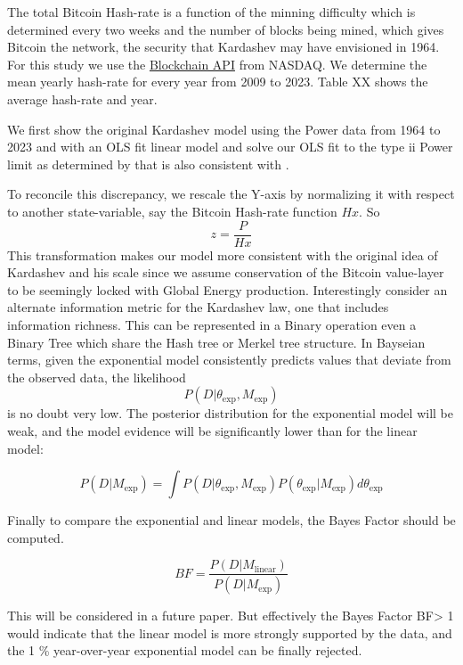 \documentclass[final,5p,times,twocolumn,authoryear]{elsarticle}
\begin{document}
The total Bitcoin Hash-rate is a function of the minning difficulty which is determined every two weeks and the number of blocks being mined, which gives Bitcoin the network, the security that Kardashev may have envisioned in 1964. For this study we use the \href{https://data.nasdaq.com/data/BCHAIN/HRATE-bitcoin-hash-rate}{Blockchain API} from NASDAQ. We determine the mean yearly hash-rate for every year from 2009 to 2023. Table XX shows the average hash-rate and year. 

We first show the original Kardashev model using the Power data from 1964 to 2023 and with an OLS fit linear model and solve our OLS fit to the type ii Power limit as determined by \cite{kar64} that is also consistent with \cite{sagan73}.

To reconcile this discrepancy, we rescale the Y-axis by normalizing it with respect to another state-variable, say the Bitcoin Hash-rate function $H{x}$. So $$z=\frac{P}{Hx}$$ This transformation makes our model more consistent with the original idea of Kardashev and his scale since we assume conservation of the Bitcoin value-layer to be seemingly locked with Global Energy production. Interestingly \cite{sagan73} consider an alternate information metric for the Kardashev law, one that includes information richness. This can be represented in a Binary operation even a Binary Tree which share the Hash tree or Merkel tree structure. In Bayseian terms, given the exponential model consistently predicts values that deviate from the observed data, the likelihood $$ P(D | \theta_{\text{exp}}, M_{\text{exp}})$$ is no doubt very low. The posterior distribution for the exponential model will be weak, and the model evidence will be significantly lower than for the linear model:

$$P(D | M_{\text{exp}}) = \int P(D | \theta_{\text{exp}}, M_{\text{exp}}) P(\theta_{\text{exp}} | M_{\text{exp}}) d\theta_{\text{exp}}
$$

 

Finally to compare the exponential and linear models, the Bayes Factor should be computed.

$$BF = \frac{P(D | M_{\text{linear}})}{P(D | M_{\text{exp}})}
$$

This will be considered in a future paper. But effectively the Bayes Factor BF> 1 would indicate that the linear model is more strongly supported by the data, and the 1 \% year-over-year exponential model can be finally rejected.
\end{document}
